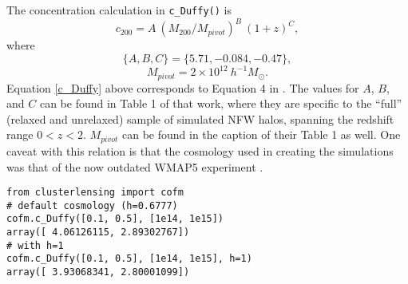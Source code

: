 \documentclass[twocolumn]{aastex6}
\newcommand{\code}{\lstinline[style=codeintext]}
\begin{document}
The concentration calculation in \code{c_Duffy()} is
\begin{equation}\label{c_Duffy}
c_{200} = A\ (M_{200} / M_{pivot})^B \ (1 + z)^C,
\end{equation}
where
\begin{equation}
\{A, B, C\} = \{5.71, -0.084, -0.47\},
\end{equation}
\begin{equation}
M_{pivot} = 2 \times 10^{12}\ h^{-1} M_\odot.
\end{equation}
Equation \ref{c_Duffy} above corresponds to Equation 4 in \citet{Duffy08}. The values for $A$, $B$, and $C$ can be found in Table 1 of that work, where they are specific to the ``full'' (relaxed and unrelaxed) sample of simulated NFW halos, spanning the redshift range $0 < z < 2$. $M_{pivot}$ can be found in the caption of their Table 1 as well. One caveat with this relation is that the cosmology used in creating the \citet{Duffy08} simulations was that of the now outdated WMAP5 experiment \citep{WMAP5}.

\begin{lstlisting}
from clusterlensing import cofm
# default cosmology (h=0.6777)
cofm.c_Duffy([0.1, 0.5], [1e14, 1e15])
array([ 4.06126115, 2.89302767])
# with h=1
cofm.c_Duffy([0.1, 0.5], [1e14, 1e15], h=1)
array([ 3.93068341, 2.80001099])
\end{lstlisting}
\end{document}
